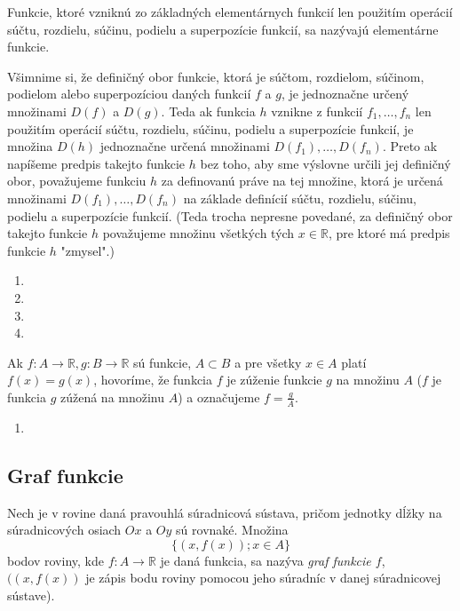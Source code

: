 Funkcie, ktoré vzniknú zo základných elementárnych funkcií len použitím
operácií súčtu, rozdielu, súčinu, podielu a superpozície funkcií, sa nazývajú
elementárne funkcie.

Všimnime si, že definičný obor funkcie, ktorá je súčtom, rozdielom, súčinom,
podielom alebo superpozíciou daných funkcií $f$ a $g$, je jednoznačne určený
množinami $D(f)$ a $D(g)$. Teda ak funkcia $h$ vznikne z funkcií
$f_1,\ldots,f_n$ len použitím operácií súčtu, rozdielu, súčinu, podielu a
superpozície funkcií, je množina $D(h)$ jednoznačne určená množinami
$D(f_1),\ldots,D(f_n)$. Preto ak napíšeme predpis takejto funkcie $h$ bez toho,
aby sme výslovne určili jej definičný obor, považujeme funkciu $h$ za
definovanú práve na tej množine, ktorá je určená množinami
$D(f_1),\ldots,D(f_n)$ na základe definícií súčtu, rozdielu, súčinu, podielu a
superpozície funkcií. (Teda trocha nepresne povedané, za definičný obor takejto
funkcie $h$ považujeme množinu všetkých tých $x\in\mathbb{R}$, pre ktoré má
predpis funkcie $h$ "zmysel".)

\begin{enumerate}[resume]
  \item {}
  \item {}
  \item {}
  \item {}
\end{enumerate}

Ak $f: A \rightarrow \mathbb{R}, g: B \rightarrow \mathbb{R}$ sú funkcie, $A
\subset B$ a pre všetky $x \in A$ platí $f(x) = g(x)$, hovoríme, že funkcia $f$
je zúženie funkcie $g$ na množinu $A$ ($f$ je funkcia $g$ zúžená na množinu
$A$) a označujeme $f = \frac{g}{A}$.

\begin{enumerate}[resume]
  \item {}
\end{enumerate}

\subsection{Graf funkcie}

Nech je v rovine daná pravouhlá súradnicová sústava, pričom jednotky dĺžky na
súradnicových osiach $Ox$ a $Oy$ sú rovnaké. Množina
\[
  \{(x,f(x)); x \in A\}
\]
bodov roviny, kde $f:A \rightarrow \mathbb{R}$ je daná funkcia, sa nazýva
\emph{graf funkcie $f$}, $((x,f(x))$ je zápis bodu roviny pomocou jeho súradníc
v danej súradnicovej sústave).

